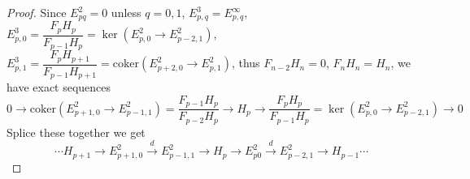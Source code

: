 \documentclass{article}
\theoremstyle{definition}
\theoremstyle{remark}
\theoremstyle{definition}
\begin{document}
\begin{proof}
Since $E_{pq}^2=0$ unless $q=0,1$, $E^3_{p,q}=E^\infty_{p,q}$, $E^3_{p,0}=\dfrac{F_pH_p}{F_{p-1}H_p}=\ker(E^2_{p,0}\to E^2_{p-2,1})$, $E^3_{p,1}=\dfrac{F_pH_{p+1}}{F_{p-1}H_{p+1}}=\mathrm{coker}(E^2_{p+2,0}\to E^2_{p,1})$, thus $F_{n-2}H_n=0$, $F_nH_n=H_n$, we have exact sequences
\[0\to\mathrm{coker}(E^2_{p+1,0}\to E^2_{p-1,1})=\dfrac{F_{p-1}H_p}{F_{p-2}H_p}\to H_p\to\dfrac{F_pH_p}{F_{p-1}H_p}=\ker(E^2_{p,0}\to E^2_{p-2,1})\to0\]
Splice these together we get
\[\cdots H_{p+1}\to E^2_{p+1,0}\xrightarrow dE^2_{p-1,1}\to H_p\to E^2_{p0}\xrightarrow dE^2_{p-2,1}\to H_{p-1}\cdots\]
\end{proof}
\end{document}
